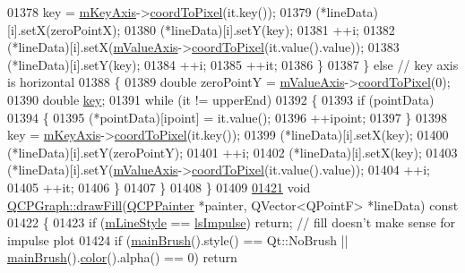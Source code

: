 \begin{DoxyCode}
01378       key = \hyperlink{a00024_a692421b963472fa6e16156a74ba96832}{mKeyAxis}->\hyperlink{a00025_a985ae693b842fb0422b4390fe36d299a}{coordToPixel}(it.key());
01379       (*lineData)[i].setX(zeroPointX);
01380       (*lineData)[i].setY(key);
01381       ++i;
01382       (*lineData)[i].setX(\hyperlink{a00024_acfc46d619ab9598be33b64146da45822}{mValueAxis}->\hyperlink{a00025_a985ae693b842fb0422b4390fe36d299a}{coordToPixel}(it.value().value));
01383       (*lineData)[i].setY(key);
01384       ++i;
01385       ++it;
01386     \}
01387   \} \textcolor{keywordflow}{else} \textcolor{comment}{// key axis is horizontal}
01388   \{
01389     \textcolor{keywordtype}{double} zeroPointY = \hyperlink{a00024_acfc46d619ab9598be33b64146da45822}{mValueAxis}->\hyperlink{a00025_a985ae693b842fb0422b4390fe36d299a}{coordToPixel}(0);
01390     \textcolor{keywordtype}{double} \hyperlink{a00116_a94bb892c30911cd62cba0707a5395be4}{key};
01391     \textcolor{keywordflow}{while} (it != upperEnd)
01392     \{
01393       \textcolor{keywordflow}{if} (pointData)
01394       \{
01395         (*pointData)[ipoint] = it.value();
01396         ++ipoint;
01397       \}
01398       key = \hyperlink{a00024_a692421b963472fa6e16156a74ba96832}{mKeyAxis}->\hyperlink{a00025_a985ae693b842fb0422b4390fe36d299a}{coordToPixel}(it.key());
01399       (*lineData)[i].setX(key);
01400       (*lineData)[i].setY(zeroPointY);
01401       ++i;
01402       (*lineData)[i].setX(key);
01403       (*lineData)[i].setY(\hyperlink{a00024_acfc46d619ab9598be33b64146da45822}{mValueAxis}->\hyperlink{a00025_a985ae693b842fb0422b4390fe36d299a}{coordToPixel}(it.value().value));
01404       ++i;
01405       ++it;
01406     \}
01407   \}
01408 \}
01409 
\hypertarget{a00115_source_l01421}{}\hyperlink{a00031_ad6d07926e6d6b7cfa70258780d47b7a0}{01421} \textcolor{keywordtype}{void} \hyperlink{a00031_ad6d07926e6d6b7cfa70258780d47b7a0}{QCPGraph::drawFill}(\hyperlink{a00047}{QCPPainter} *painter, QVector<QPointF> *lineData)\textcolor{keyword}{ const}
01422 \textcolor{keyword}{}\{
01423   \textcolor{keywordflow}{if} (\hyperlink{a00031_a8604fd98402035a63375849f7341ee25}{mLineStyle} == \hyperlink{a00031_ad60175cd9b5cac937c5ee685c32c0859aa3b358b4ae7cca94aceeb8e529c12ebb}{lsImpulse}) \textcolor{keywordflow}{return}; \textcolor{comment}{// fill doesn't make sense for impulse plot}
01424   \textcolor{keywordflow}{if} (\hyperlink{a00024_ae74c123832da180c17e22203e748d9b7}{mainBrush}().style() == Qt::NoBrush || \hyperlink{a00024_ae74c123832da180c17e22203e748d9b7}{mainBrush}().\hyperlink{a00116_ae35093fbf4f645dcefd930ca8c68b622}{color}().alpha() == 0) \textcolor{keywordflow}{return}

\end{DoxyCode}
